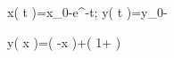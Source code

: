 x\left( t \right)=x_{0}-e^{-t;}
y\left( t \right)=y_{0}-

y\left( x \right)=\ln \left( -x \right)+\left( 1+ \right)